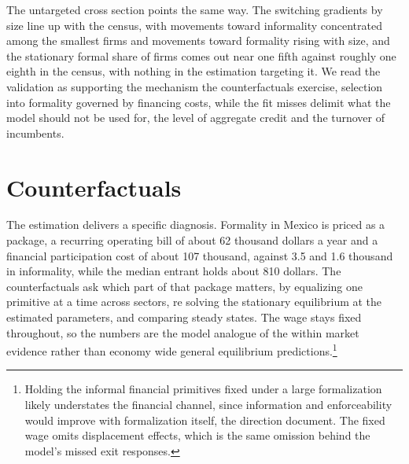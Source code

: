 \documentclass[12pt]{article}
\begin{document}
The untargeted cross section points the same way. The switching gradients by size line up with the census, with movements toward informality concentrated among the smallest firms and movements toward formality rising with size, and the stationary formal share of firms comes out near one fifth against roughly one eighth in the census, with nothing in the estimation targeting it. We read the validation as supporting the mechanism the counterfactuals exercise, selection into formality governed by financing costs, while the fit misses delimit what the model should not be used for, the level of aggregate credit and the turnover of incumbents.

\section{Counterfactuals}
\label{sec:counterfactual}

The estimation delivers a specific diagnosis. Formality in Mexico is priced as a package, a recurring operating bill of about 62 thousand dollars a year and a financial participation cost of about 107 thousand, against 3.5 and 1.6 thousand in informality, while the median entrant holds about 810 dollars. The counterfactuals ask which part of that package matters, by equalizing one primitive at a time across sectors, re solving the stationary equilibrium at the estimated parameters, and comparing steady states. The wage stays fixed throughout, so the numbers are the model analogue of the within market evidence rather than economy wide general equilibrium predictions.\footnote{Holding the informal financial primitives fixed under a large formalization likely understates the financial channel, since information and enforceability would improve with formalization itself, the direction \citet{brooks2020credit} document. The fixed wage omits displacement effects, which is the same omission behind the model's missed exit responses.}
\end{document}
